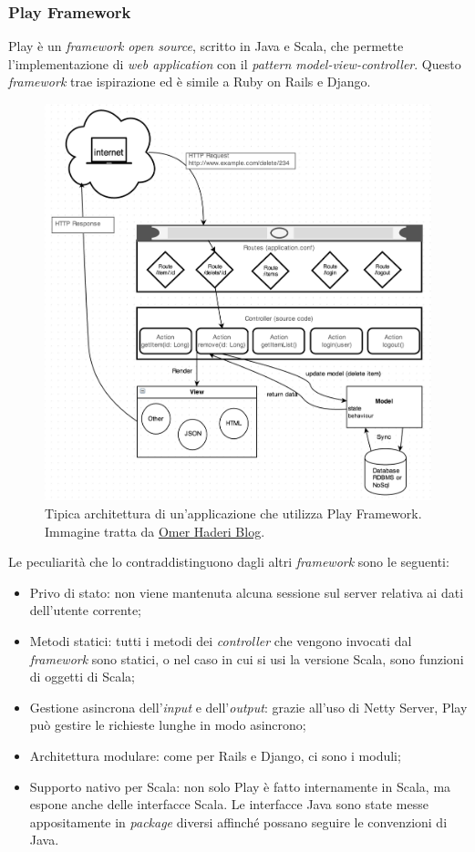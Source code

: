 \subsubsection{Play Framework}
Play è un \emph{framework} \emph{open source}, scritto in Java e Scala, che permette l'implementazione di \emph{web application} con il \emph{pattern model-view-controller}. Questo \emph{framework} trae ispirazione ed è simile a Ruby on Rails e Django.
\begin{figure}[ht]
\centering
\includegraphics[scale=0.5]{immagini/play-arch}
\caption{Tipica architettura di un'applicazione che utilizza Play Framework. Immagine tratta da \href{https://110j.wordpress.com/2013/10/23/play-framework-2-1-architecture/}{Omer Haderi Blog}.}
\label{fig:play-app}
\end{figure}
\newpage
Le peculiarità che lo contraddistinguono dagli altri \emph{framework} sono le seguenti:
\begin{itemize}
\item Privo di stato: non viene mantenuta alcuna sessione sul server relativa ai dati dell'utente corrente;
\item Metodi statici: tutti i metodi dei \emph{controller} che vengono invocati dal \emph{framework} sono statici, o nel caso in cui si usi la versione Scala, sono funzioni di oggetti di Scala;
\item Gestione asincrona dell'\emph{input} e dell'\emph{output}: grazie all'uso di Netty Server, Play può gestire le richieste lunghe in modo asincrono;
\item Architettura modulare: come per Rails e Django, ci sono i moduli;
\item Supporto nativo per Scala: non solo Play è fatto internamente in Scala, ma espone anche delle interfacce Scala. Le interfacce Java sono state messe appositamente in \emph{package} diversi affinché possano seguire le convenzioni di Java.
\end{itemize}
